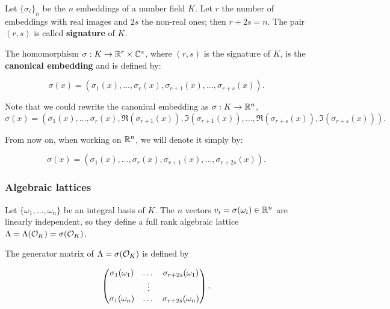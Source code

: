 \documentclass[a4paper,12pt]{article}
\begin{document}
\begin{definition}
  Let $\{\sigma_i\}_n$ be the $n$ embeddings of a number field $K$. Let $r$ the number of embeddings with real images and $2s$ the non-real ones; then
  $r + 2s = n$. The pair $\left(r,s\right)$ is called \textbf{signature} of $K$.
\end{definition}

   \begin{definition}\label{definition:canonical-embedding}
The homomorphism $\sigma: K \rightarrow \mathbb{R}^r \times \mathbb{C}^s$, where $(r,s)$ is the signature of $K$, is the \textbf{canonical embedding} and is defined by:

\[
\sigma(x) = \left(\sigma_1(x), \dots , \sigma_r(x), \sigma_{r+1}(x), \dots, \sigma_{r+s}(x) \right).
\]

Note that we could rewrite the canonical embedding as $\sigma : K \rightarrow \mathbb{R}^n$,
\[
\sigma(x) = \left( \sigma_1(x), \dots , \sigma_r(x), \Re(\sigma_{r+1}(x)), \Im(\sigma_{r+1}(x)), \dots,
  \Re(\sigma_{r+s}(x)), \Im(\sigma_{r+s}(x)) \right).
\]


From now on, when working on $\mathbb{R}^n$, we will denote it simply by:

\[
\sigma(x) = \left( \sigma_1(x), \dots , \sigma_r(x), \sigma_{r+1}(x), \dots, \sigma_{r+2s}(x) \right).
\]

\end{definition}
\subsubsection{Algebraic lattices}
\label{sec:orgc66ac54}

\begin{theorem}\label{theorem:algebraic-lattice}
Let $\{\omega_1,...,\omega_n\}$ be an integral basis of $K$. The $n$ vectors $v_i = \sigma(\omega_i)
\in \mathbb{R}^n$ are linearly independent, so they define a full rank algebraic lattice
$\Lambda = \Lambda(\mathcal{O}_K) = \sigma(\mathcal{O}_K)$.
\end{theorem} 
The generator matrix of \(\Lambda = \sigma(\mathcal{O}_K)\) is defined by

\begin{equation}
  \label{definition:gen-matrix-alg-lattices}
  \begin{pmatrix}
    \sigma_1(\omega_1) & $\dots$ &  \sigma_{r+2s}(\omega_1) \\
    & \vdots & \\
    \sigma_1(\omega_n) & $\dots$ & \sigma_{r+2s}(\omega_n) \\
  \end{pmatrix}.  
\end{equation}
\end{document}
